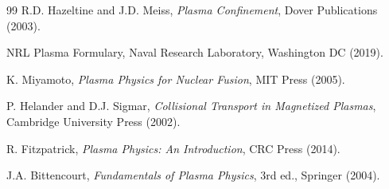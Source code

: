 \documentclass[11pt,a4paper]{article}
\begin{document}
\begin{thebibliography}{99}
R.D. Hazeltine and J.D. Meiss, \textit{Plasma Confinement}, Dover Publications (2003).

NRL Plasma Formulary, Naval Research Laboratory, Washington DC (2019).

K. Miyamoto, \textit{Plasma Physics for Nuclear Fusion}, MIT Press (2005).

P. Helander and D.J. Sigmar, \textit{Collisional Transport in Magnetized Plasmas}, Cambridge University Press (2002).

R. Fitzpatrick, \textit{Plasma Physics: An Introduction}, CRC Press (2014).

J.A. Bittencourt, \textit{Fundamentals of Plasma Physics}, 3rd ed., Springer (2004).

\end{thebibliography}
\end{document}

